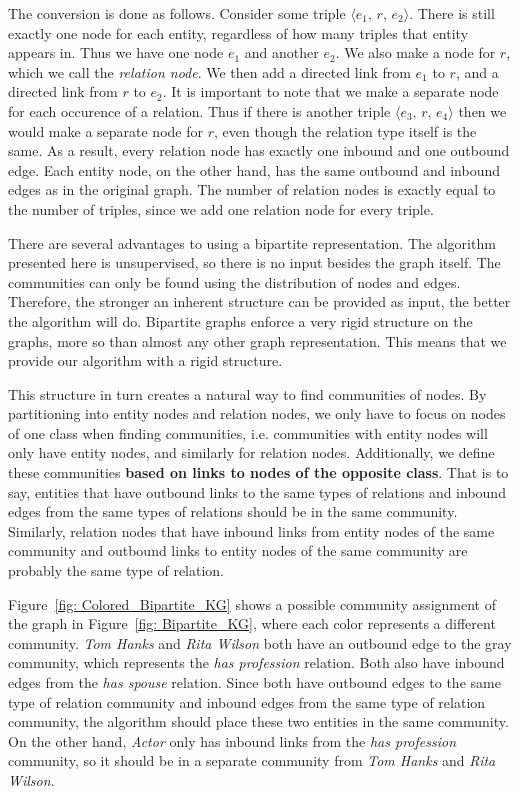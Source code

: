 \documentclass[12pt]{article}
\begin{document}
The conversion is done as follows. Consider some triple $\langle e_1,\,r,\,e_2
\rangle$. There is still exactly one node for each entity, regardless of how
many triples that entity appears in. Thus we have one node $e_1$ and another
$e_2$. We also make a node for $r$, which we call the \textit{relation node}. We
then add a directed link from $e_1$ to $r$, and a directed link from $r$ to
$e_2$. It is important to note that we make a separate node for each occurence
of a relation. Thus if there is another triple $\langle e_3,\,r,\,e_4 \rangle$
then we would make a separate node for $r$, even though the relation type itself
is the same. As a result, every relation node has exactly one inbound and one
outbound edge. Each entity node, on the other hand, has the same outbound and
inbound edges as in the original graph. The number of relation nodes is exactly
equal to the number of triples, since we add one relation node for every triple.

There are several advantages to using a bipartite representation. The algorithm
presented here is unsupervised, so there is no input besides the graph itself.
The communities can only be found using the distribution of nodes and edges.
Therefore, the stronger an inherent structure can be provided as input, the
better the algorithm will do. Bipartite graphs enforce a very rigid structure on
the graphs, more so than almost any other graph representation. This means that
we provide our algorithm with a rigid structure.

This structure in turn creates a natural way to find communities of nodes. By
partitioning into entity nodes and relation nodes, we only have to focus on
nodes of one class when finding communities, i.e. communities with entity nodes
will only have entity nodes, and similarly for relation nodes. Additionally, we
define these communities \textbf{based on links to nodes of the opposite class}.
That is to say, entities that have outbound links to the same types of relations
and inbound edges from the same types of relations should be in the same
community. Similarly, relation nodes that have inbound links from entity nodes
of the same community and outbound links to entity nodes of the same community
are probably the same type of relation.

Figure~\ref{fig: Colored_Bipartite_KG} shows a possible community assignment of
the graph in Figure~\ref{fig: Bipartite_KG}, where each color represents a
different community. \textit{Tom Hanks} and \textit{Rita Wilson} both have an
outbound edge to the gray community, which represents the \textit{has
profession} relation. Both also have inbound edges from the \textit{has spouse}
relation. Since both have outbound edges to the same type of relation community
and inbound edges from the same type of relation community, the algorithm should
place these two entities in the same community. On the other hand,
\textit{Actor} only has inbound links from the \textit{has profession}
community, so it should be in a separate community from \textit{Tom Hanks} and
\textit{Rita Wilson}.
\end{document}
